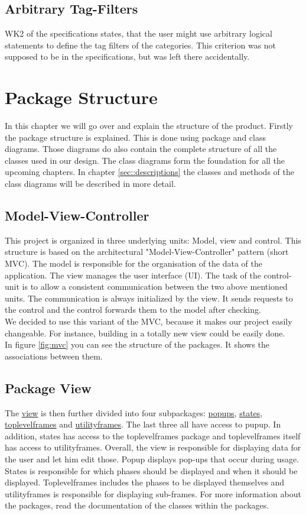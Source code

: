 \documentclass[parskip=full]{report} %
\begin{document}
\section*{Arbitrary Tag-Filters}
WK2 of the specifications states, that the user might use arbitrary logical statements to define the tag filters of the categories. This criterion was not supposed to be in the specifications, but was left there accidentally.



\chapter{Package Structure}
In this chapter we will go over and explain the structure of the product. Firstly the package structure is explained. This is done using package and class diagrams. Those diagrams do also contain the complete structure of all the classes used in our design. The class diagrams form the foundation for all the upcoming chapters. In chapter \ref{sec::descriptions} the classes and methods of the class diagrams will be described in more detail.

\section{Model-View-Controller} \label{sec::mvc}
This project is organized in three underlying units: Model, view and control. This structure is based on the architectural "Model-View-Controller" pattern (short MVC). 
The model is responsible for the organisation of the data of the application. The view manages the user interface (UI). The task of the control-unit is to allow a consistent communication between the two above mentioned units. The communication is always initialized by the view. It sends requests to the control and the control forwards them to the model after checking.\\
We decided to use this variant of the MVC, because it makes our project easily changeable. For instance, building in a totally new view could be easily done.\\
In figure \ref{fig:mvc} you can see the structure of the packages. It shows the associations between them.


\section{Package View}
The \hyperlink{view}{view} is then further divided into four subpackages: \hyperlink{popups}{popups}, \hyperlink{states}{states}, \hyperlink{toplevelframes}{toplevelframes} and \hyperlink{utilityframes}{utilityframes}. The last three all have access to pupup. In addition, states has access to the toplevelframes package and toplevelframes itself has access to utilityframes. Overall, the view is responsible for displaying data for the user and let him edit those. Popup displays pop-ups that occur during usage. States is responsible for which phases should be displayed and when it should be displayed. Toplevelframes includes the phases to be displayed themselves and utilityframes is responsible for displaying sub-frames. For more information about the packages, read the documentation of the classes within the packages.
\end{document}
